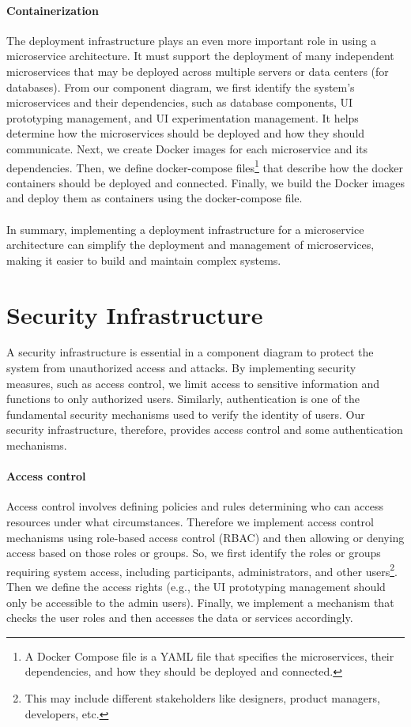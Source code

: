 \paragraph{Containerization}
The deployment infrastructure plays an even more important role in using a microservice architecture. 
It must support the deployment of many independent microservices that may be deployed across multiple servers or data centers (for databases).
From our component diagram, we first identify the system's microservices and their dependencies, such as database components, UI prototyping management, and UI experimentation management. 
It helps determine how the microservices should be deployed and how they should communicate.
Next, we create Docker images for each microservice and its dependencies.
Then, we define docker-compose files\footnote{A Docker Compose file is a YAML file that specifies the microservices, their dependencies, and how they should be deployed and connected.} that describe how the docker containers should be deployed and connected.
Finally, we build the Docker images and deploy them as containers using the docker-compose file. \\\\
In summary, implementing a deployment infrastructure for a microservice architecture can simplify the deployment and management of microservices, making it easier to build and maintain complex systems.

\clearpage
\section{Security Infrastructure}
\label{sc:section:security}
A security infrastructure is essential in a component diagram to protect the system from unauthorized access and attacks. 
By implementing security measures, such as access control, we limit access to sensitive information and functions to only authorized users.
Similarly, authentication is one of the fundamental security mechanisms used to verify the identity of users.
Our security infrastructure, therefore, provides access control and some authentication mechanisms.

\paragraph{Access control}
Access control involves defining policies and rules determining who can access resources under what circumstances.
Therefore we implement access control mechanisms using role-based access control (RBAC) and then allowing or denying access based on those roles or groups.
So, we first identify the roles or groups requiring system access, including participants, administrators, and other users\footnote{This may include different stakeholders like designers, product managers, developers, etc.}. 
Then we define the access rights (e.g., the UI prototyping management should only be accessible to the admin users).
Finally, we implement a mechanism that checks the user roles and then accesses the data or services accordingly. 

